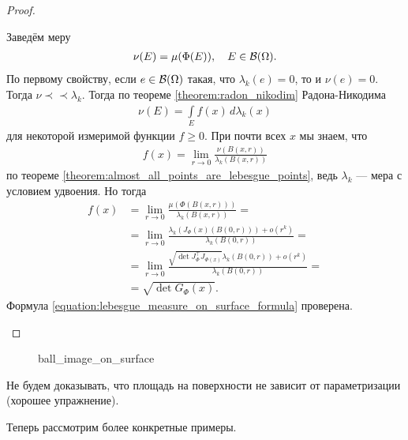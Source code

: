 \begin{proof}
\begin{enumerate}
  Заведём меру
  \begin{align*}
   \nu(E) = \mu(\Phi(E)), \quad E \in \mathcal{B}(\Omega)
  .\end{align*} По первому свойству, если $e \in \mathcal{B}(\Omega)$  такая, что $\lambda_k(e) = 0$, то и  $\nu(e) = 0$.  Тогда $\nu \prec \prec \lambda_k$. Тогда по теореме \ref{theorem:radon_nikodim} Радона-Никодима
  \begin{align*}
   \nu(E) = \int\limits_{E} f(x) \, d\lambda_k(x)  
  \end{align*} для некоторой измеримой функции $f \geqslant 0$. При почти всех $x$ мы знаем, что \begin{align*}
  f(x) = \lim_{r \to 0} \frac{\nu(B(x,r))}{\lambda_k(B(x,r))}
 \end{align*} по теореме \ref{theorem:almost_all_points_are_lebesgue_points}, ведь $\lambda_k$ --- мера с условием удвоения. Но тогда
 \begin{align*}
  f(x) &= \lim_{r \to 0}  \frac{\mu(\Phi(B(x,r)))}{\lambda_k(B(x,r))} = \\
  &= \lim_{r \to 0}  \frac{\lambda_k(J_{\Phi}(x)(B(0,r))) + o(r^{k})}{\lambda_k(B(0,r))} = \\
  &= \lim_{r \to 0} \frac{\sqrt{\det J_{\Phi}^{\top}J_{\Phi(x)}} \lambda_k(B(0,r)) + o(r^{k})}{\lambda_k(B(0,r))} = \\
  &= \sqrt{\det G_{\Phi}(x)}
 .\end{align*}  Формула \eqref{equation:lebesgue_measure_on_surface_formula} проверена.
\end{enumerate}
\end{proof}

\begin{figure}[ht]
    \centering
    \caption{ball_image_on_surface}
    \label{fig:ball_image_on_surface}
\end{figure}

\begin{remrk*}
 Не будем доказывать, что площадь на поверхности не зависит от параметризации (хорошее упражнение).
\end{remrk*}

Теперь рассмотрим более конкретные примеры.

